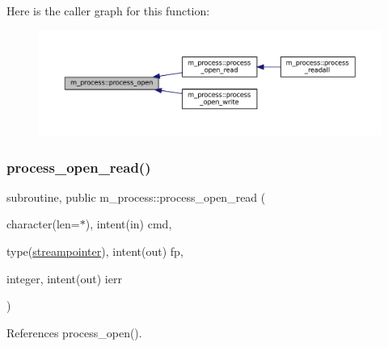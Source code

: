 Here is the caller graph for this function\+:\nopagebreak
\begin{figure}[H]
\begin{center}
\leavevmode
\includegraphics[width=350pt]{namespacem__process_a3c0f543a9ceff2671041d73660f60a59_icgraph}
\end{center}
\end{figure}
\mbox{\label{namespacem__process_aaaf4d1926258a4cec7da7fc61c38c79d}} 
\subsubsection{\texorpdfstring{process\+\_\+open\+\_\+read()}{process\_open\_read()}}
{\footnotesize\ttfamily subroutine, public m\+\_\+process\+::process\+\_\+open\+\_\+read (\begin{DoxyParamCaption}\item[{character(len=$\ast$), intent(in)}]{cmd,  }\item[{type(\mbox{\hyperlink{structm__process_1_1streampointer}{streampointer}}), intent(out)}]{fp,  }\item[{integer, intent(out)}]{ierr }\end{DoxyParamCaption})}



References process\+\_\+open().

